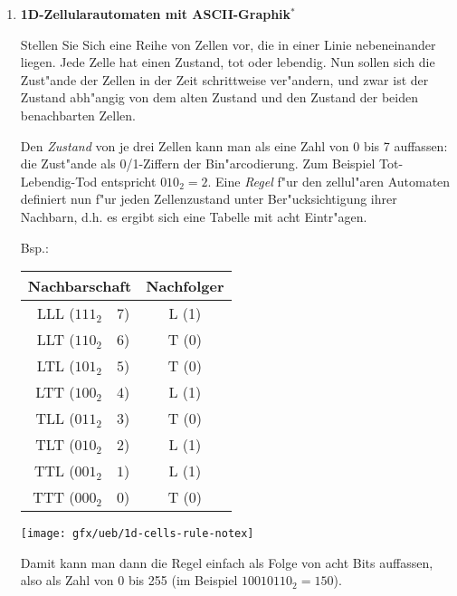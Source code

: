 \begin{enumerate}[1.]
\item \textbf{1D-Zellularautomaten mit ASCII-Graphik$^{*}$} 

Stellen Sie Sich eine Reihe von Zellen vor, die in einer Linie
nebeneinander liegen.  Jede Zelle hat einen Zustand, tot oder
lebendig.  Nun sollen sich die Zust"ande der Zellen in der Zeit
schrittweise ver"andern, und zwar ist der Zustand abh"angig von dem
alten Zustand und den Zustand der beiden benachbarten Zellen.

Den \emph{Zustand} von je drei Zellen kann man als eine Zahl von 0 bis 7 
auffassen: die Zust"ande als 0/1-Ziffern der Bin"arcodierung. Zum Beispiel
Tot-Lebendig-Tod entspricht $010_2 = 2$.
%
Eine \emph{Regel} f"ur den zellul"aren Automaten definiert nun f"ur jeden 
Zellenzustand  unter Ber"ucksichtigung ihrer Nachbarn, d.h. es ergibt sich
eine Tabelle mit acht Eintr"agen.

\begin{minipage}{\textwidth}
  Bsp.: 
  \begin{minipage}{0.45\textwidth}
    \begin{center}
\begin{tabular}{r@{ = }l|c}
\multicolumn{2}{c|}{Nachbarschaft}&Nachfolger\\
\hline
LLL ($111_2$&$7$)& L (1) \\ 
LLT ($110_2$&$6$)& T (0) \\ 
LTL ($101_2$&$5$)& T (0) \\ 
LTT ($100_2$&$4$)& L (1) \\ 
TLL ($011_2$&$3$)& T (0) \\ 
TLT ($010_2$&$2$)& L (1) \\ 
TTL ($001_2$&$1$)& L (1) \\ 
TTT ($000_2$&$0$)& T (0) \\ 
\end{tabular}
    \end{center}
  \end{minipage}
\hfill
  \begin{minipage}{0.45\textwidth}
    \begin{center}
       \texttt{[image: gfx/ueb/1d-cells-rule-notex]}
     \end{center}
  \end{minipage}
\end{minipage}

\vspace{1ex} \noindent
Damit kann man dann die Regel einfach als Folge von acht Bits auffassen,
also als Zahl von 0 bis 255 (im Beispiel $10010110_2 = 150$).


\end{enumerate}

